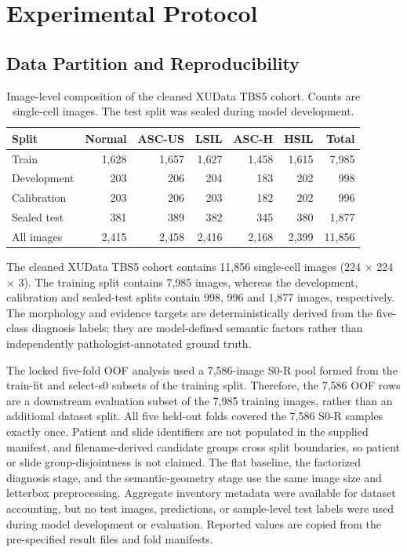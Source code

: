 \documentclass[conference]{IEEEtran}
\begin{document}
\section{Experimental Protocol}
\label{sec:protocol}

\subsection{Data Partition and Reproducibility}

\begin{table}[t]
\caption{Image-level composition of the cleaned XUData TBS5 cohort.
Counts are single-cell images. The test split was sealed during model
development.}
\label{tab:dataset_composition}
\centering
\footnotesize
\setlength{\tabcolsep}{3.5pt}
\renewcommand{\arraystretch}{0.95}
\begin{tabular}{lrrrrrr}
\toprule
Split & Normal & ASC-US & LSIL & ASC-H & HSIL & Total \\
\midrule
Train        & 1,628 & 1,657 & 1,627 & 1,458 & 1,615 & 7,985 \\
Development  &   203 &   206 &   204 &   183 &   202 &   998 \\
Calibration  &   203 &   206 &   203 &   182 &   202 &   996 \\
Sealed test  &   381 &   389 &   382 &   345 &   380 & 1,877 \\
\midrule
All images   & 2,415 & 2,458 & 2,416 & 2,168 & 2,399 & 11,856 \\
\bottomrule
\end{tabular}
\end{table}

The cleaned XUData TBS5 cohort contains 11,856 single-cell images
(224 $\times$ 224 $\times$ 3). The training split contains 7,985 images,
whereas the development, calibration and sealed-test splits contain 998,
996 and 1,877 images, respectively. The morphology and evidence targets
are deterministically derived from the five-class diagnosis labels; they
are model-defined semantic factors rather than independently pathologist-annotated ground truth.

The locked five-fold OOF analysis used a 7,586-image S0-R pool formed
from the train-fit and select-s0 subsets of the training split.
Therefore, the 7,586 OOF rows are a downstream evaluation subset of the
7,985 training images, rather than an additional dataset split. All five
held-out folds covered the 7,586 S0-R samples exactly once. Patient and
slide identifiers are not populated in the supplied manifest, and
filename-derived candidate groups cross split boundaries, so patient or
slide group-disjointness is not claimed. The
flat baseline, the factorized diagnosis stage, and the semantic-geometry
stage use the same image size and letterbox preprocessing. Aggregate
inventory metadata were available for dataset accounting, but no test
images, predictions, or sample-level test labels were used during model
development or evaluation. Reported values are copied from the
pre-specified result files and fold manifests.
\end{document}
